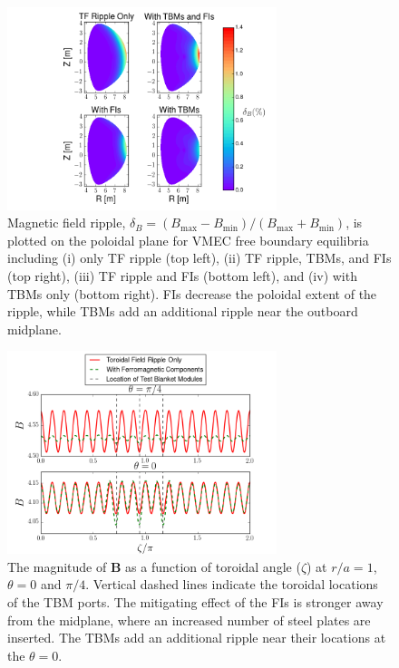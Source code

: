 \documentclass[aip, pop, preprint]{revtex4-1}
\numberwithin{figure}{section}
\numberwithin{equation}{section}
\begin{document}
\begin{figure}[h!]
\centering
\includegraphics[width=0.7\textwidth]{ripplecontour.png}
\caption{\label{fig:ripplecontour} Magnetic field ripple, $\delta_B = (B_{\text{max}}-B_{\text{min}})/(B_{\text{max}} + B_{\text{min}})$, is plotted on the poloidal plane for VMEC free boundary equilibria including (i) only TF ripple (top left), (ii) TF ripple, TBMs, and FIs (top right), (iii) TF ripple and FIs (bottom left), and (iv) with TBMs only (bottom right). FIs decrease the poloidal extent of the ripple, while TBMs add an additional ripple near the outboard midplane.}
\end{figure}

\begin{figure}[h!]
\centering
\includegraphics[width=0.7\textwidth]{toroidalripple.png}
\caption{\label{fig:toroidalripple} The magnitude of $\bm{B}$ as a function of toroidal angle ($\zeta$) at $r/a = 1$, $\theta = 0$ and $\pi/4$. Vertical dashed lines indicate the toroidal locations of the TBM ports. The mitigating effect of the FIs is stronger away from the midplane, where an increased number of steel plates are inserted. The TBMs add an additional ripple near their locations at the $\theta = 0$. }
\end{figure}
\end{document}
